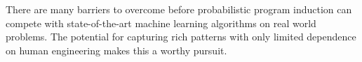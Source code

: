 \documentclass[a4paper,10pt]{article}
\begin{document}

There are many barriers to overcome before probabilistic program induction can compete with state-of-the-art machine learning algorithms on real world problems. The potential for capturing rich patterns with only limited dependence on human engineering makes this a worthy pursuit.

\newpage


\end{document}
